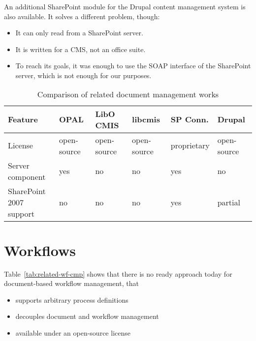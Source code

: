 An additional SharePoint module\cite{drupal-sp} for the Drupal content management system is also available. It solves a different problem, though:

\begin{itemize}
\item It can only read from a SharePoint server.
\item It is written for a CMS, not an office suite.
\item To reach its goals, it was enough to use the SOAP interface of the
SharePoint server, which is not enough for our purposes.
\end{itemize}

\begin{table}[H]
  \begin{center}
    \begin{tabular}{| l | l | l | l | l | l |}
    \hline
    \textbf{Feature} & \textbf{OPAL} & \textbf{LibO CMIS} & \textbf{libcmis} & \textbf{SP Conn.} & \textbf{Drupal} \\ \hline
    License          & open-source   & open-source        & open-source      & proprietary                   & open-source \\ \hline
    Server component & yes           & no                 & no               & yes                           & no \\ \hline
    \makecell[l]{SharePoint 2007 \\ support} & no & no    & no               & yes                           & partial \\ \hline
    \end{tabular}
  \end{center}
  \caption{Comparison of related document management works}
  \label{tab:related-cmp}
\end{table}

\section{Workflows}

Table~\ref{tab:related-wf-cmp} shows that there is no ready approach today for
document-based workflow management, that

\begin{itemize}
\item supports arbitrary process definitions
\item decouples document and workflow management
\item available under an open-source license
\end{itemize}

